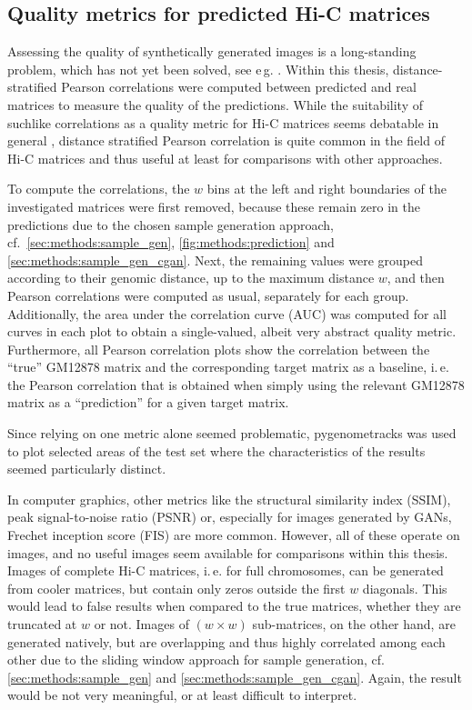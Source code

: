 \subsection{Quality metrics for predicted Hi-C matrices}
Assessing the quality of synthetically generated images is a long-standing problem, which has not yet been solved, see e\,g. \cite[p.\,19]{Wang2020}.
Within this thesis, distance-stratified Pearson correlations were computed between predicted and real matrices to measure the quality of the predictions.
While the suitability of suchlike correlations as a quality metric for Hi-C matrices seems debatable in general \cite{Yang2017}, 
distance stratified Pearson correlation is quite common in the field of Hi-C matrices and thus useful at least for comparisons with other approaches.

To compute the correlations, the $w$ bins at the left and right boundaries of the investigated matrices were first removed, because these remain zero 
in the predictions due to the chosen sample generation approach, 
cf.~\cref{sec:methods:sample_gen}, \cref{fig:methods:prediction} and \ref{sec:methods:sample_gen_cgan}.
Next, the remaining values were grouped according to their genomic distance, up to the maximum distance $w$, 
and then Pearson correlations were computed as usual, separately for each group.
Additionally, the area under the correlation curve (AUC) was computed for all curves in each plot to obtain a single-valued, albeit very abstract quality metric.
Furthermore, all Pearson correlation plots show the correlation between the ``true'' GM12878 matrix and the corresponding target matrix as a baseline,
i.\,e. the Pearson correlation that is obtained when simply using the relevant GM12878 matrix as a ``prediction'' for a given target matrix.

Since relying on one metric alone seemed problematic, pygenometracks \cite{LopezDelisle2020} was used to plot selected areas of the test set 
where the characteristics of the results seemed particularly distinct.

In computer graphics, other metrics like the structural similarity index (SSIM), peak signal-to-noise ratio (PSNR) or, especially for images generated by GANs, 
Frechet inception score (FIS) are more common.
However, all of these operate on images, and no useful images seem available for comparisons within this thesis.
Images of complete Hi-C matrices, i.\,e. for full chromosomes,
can be generated from cooler matrices, but contain only zeros outside the first $w$ diagonals.
This would lead to false results when compared to the true matrices, whether they are truncated at $w$ or not.
Images of $(w\times w)$ sub-matrices, on the other hand, are generated natively, but are overlapping and thus highly correlated among each other due to the sliding window approach for sample generation, 
cf. \cref{sec:methods:sample_gen} and \ref{sec:methods:sample_gen_cgan}. 
Again, the result would be not very meaningful, or at least difficult to interpret.

